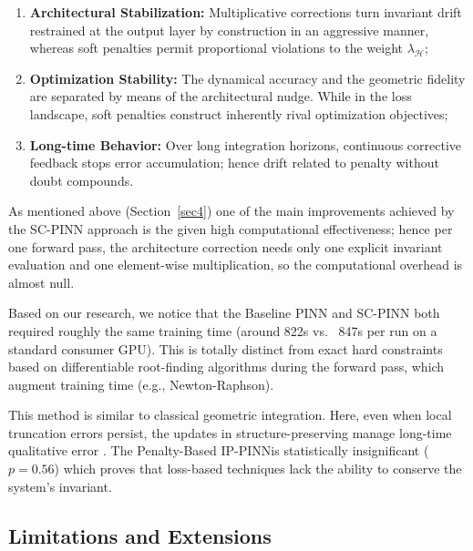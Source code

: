 \documentclass[pdflatex,sn-mathphys-num]{sn-jnl}
\theoremstyle{thmstyleone}%
\theoremstyle{thmstyletwo}%
\theoremstyle{thmstylethree}%
\newcommand{\softpinn}{Penalty-Based IP-PINN}
\providecommand{\vs}{vs.\ }
\begin{document}
	\begin{enumerate}
		\item \textbf{Architectural Stabilization:} Multiplicative corrections turn invariant drift restrained at the output layer by construction in an aggressive manner, whereas soft penalties permit proportional violations to the weight $\lambda_{\mathcal{H}}$;
		\item \textbf{Optimization Stability:} The dynamical accuracy and the geometric fidelity are separated by means of the architectural nudge. While in the loss landscape, soft penalties construct inherently rival optimization objectives;
		\item \textbf{Long-time Behavior:} Over long integration horizons, continuous corrective feedback stops error accumulation; hence drift related to penalty without doubt compounds.
	\end{enumerate}
	
	As mentioned above (Section~\ref{sec4}) one of the main improvements achieved by the SC-PINN approach is the given high computational effectiveness; hence per one forward pass, the architecture correction needs only one explicit invariant evaluation and one element-wise multiplication, so the computational overhead is almost null.  
	
	Based on our research, we notice that the Baseline PINN and SC-PINN both required roughly the same training time (around 822s \vs{} 847s per run on a standard consumer GPU). This is totally distinct from exact hard constraints based on differentiable root-finding algorithms during the forward pass, which augment training time (e.g., Newton-Raphson).
	
	This method is similar to classical geometric integration. Here, even when local truncation errors persist, the updates in structure-preserving manage long-time qualitative error \cite{hairer2006geometric}. 
	The \softpinn is statistically insignificant ($p = 0.56$) which proves that loss-based techniques lack the ability to conserve the system's invariant.  
	
	\subsection{Limitations and Extensions}\label{subsec7.2}
	
\end{document}
